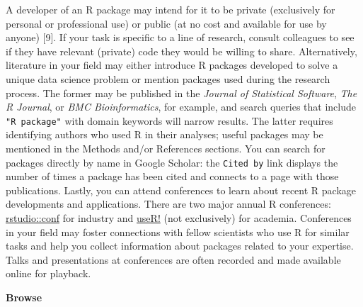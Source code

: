 \documentclass[10pt,letterpaper]{article}
\begin{document}
A developer of an R package may intend for it to be private (exclusively
for personal or professional use) or public (at no cost and available
for use by anyone) {[}9{]}. If your task is specific to a line of
research, consult colleagues to see if they have relevant (private) code
they would be willing to share. Alternatively, literature in your field
may either introduce R packages developed to solve a unique data science
problem or mention packages used during the research process. The former
may be published in the \emph{Journal of Statistical Software},
\emph{The R Journal}, or \emph{BMC Bioinformatics}, for example, and
search queries that include \texttt{"R\ package"} with domain keywords
will narrow results. The latter requires identifying authors who used R
in their analyses; useful packages may be mentioned in the Methods
and/or References sections. You can search for packages directly by name
in Google Scholar: the \texttt{Cited\ by} link displays the number of
times a package has been cited and connects to a page with those
publications. Lastly, you can attend conferences to learn about recent R
package developments and applications. There are two major annual R
conferences: \href{https://rstudio.com/conference/}{rstudio::conf} for
industry and \href{https://www.r-consortium.org/}{useR!} (not
exclusively) for academia. Conferences in your field may foster
connections with fellow scientists who use R for similar tasks and help
you collect information about packages related to your expertise. Talks
and presentations at conferences are often recorded and made available
online for playback.

\textbf{Browse}
\end{document}
